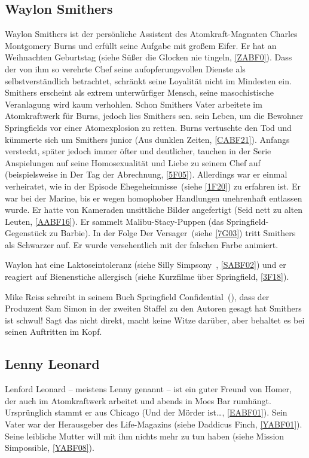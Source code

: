 \subsection{Waylon Smithers}\label{WaylonSmithers}
Waylon Smithers ist der persönliche Assistent des Atomkraft-Magnaten Charles Montgomery Burns und erfüllt seine Aufgabe mit großem Eifer. Er hat an Weihnachten Geburtstag (siehe \glqq Süßer die Glocken nie tingeln\grqq, \ref{ZABF0}). Dass der von ihm so verehrte Chef seine aufopferungsvollen Dienste als selbstverständlich betrachtet, schränkt seine Loyalität nicht im Mindesten ein. Smithers erscheint als extrem unterwürfiger Mensch, seine masochistische Veranlagung wird kaum verhohlen. Schon Smithers Vater arbeitete im Atomkraftwerk für Burns, jedoch lies Smithers sen. sein Leben, um die Bewohner Springfields vor einer Atomexplosion zu retten. Burns vertuschte den Tod und kümmerte sich um Smithers junior (\glqq Aus dunklen Zeiten\grqq , \ref{CABF21}). Anfangs versteckt, später jedoch immer öfter und deutlicher, tauchen in der Serie Anspielungen auf seine Homosexualität und Liebe zu seinem Chef auf (beispielsweise in \glqq Der Tag der Abrechnung\grqq , \ref{5F05}). Allerdings war er einmal verheiratet, wie in der Episode \glqq Ehegeheimnisse\grqq\ (siehe \ref{1F20}) zu erfahren ist. Er war bei der Marine, bis er wegen homophober Handlungen unehrenhaft entlassen wurde. Er hatte von Kameraden unsittliche Bilder angefertigt (\glqq Seid nett zu alten Leuten\grqq , \ref{AABF16}). Er sammelt Malibu-Stacy-Puppen (das Springfield-Gegenstück zu Barbie). In der Folge \glqq Der Versager\grqq\ (siehe \ref{7G03}) tritt Smithers als Schwarzer auf. Er wurde versehentlich mit der falschen Farbe animiert.

Waylon hat eine Laktoseintoleranz (siehe \glqq Silly Simpsony\grqq\ , \ref{SABF02}) und er reagiert auf Bienenstiche allergisch (siehe  Kurzfilme über Springfield\grqq , \ref{3F18}).

Mike Reiss schreibt in seinem Buch \glqq Springfield Confidential\grqq\ (\cite{Reiss19}), dass der Produzent Sam Simon in der zweiten Staffel zu den Autoren gesagt hat \glqq Smithers ist schwul! Sagt das nicht direkt, macht keine Witze darüber, aber behaltet es bei seinen Auftritten im Kopf.


\subsection{Lenny Leonard}\label{LennyLeonard}
Lenford Leonard -- meistens Lenny genannt -- ist ein guter Freund von Homer, der auch im Atomkraftwerk arbeitet und abends in Moes Bar rumhängt. Ursprünglich stammt er aus Chicago (\glqq Und der Mörder ist\dots\grqq , \ref{EABF01}). Sein Vater war der Herausgeber des Life-Magazins (siehe \glqq Daddicus Finch\grqq, \ref{YABF01}). Seine leibliche Mutter will mit ihm nichts mehr zu tun haben (siehe \glqq Mission Simpossible\grqq, \ref{YABF08}).

